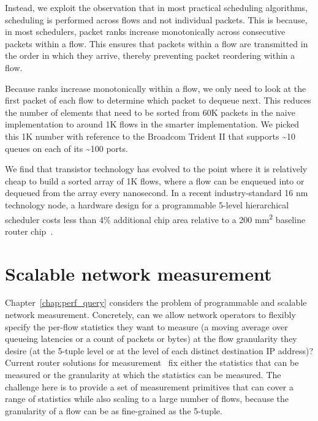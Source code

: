 Instead, we exploit the observation that in most practical scheduling
algorithms, scheduling is performed across flows and not individual packets.
This is because, in most schedulers, packet ranks increase monotonically across
consecutive packets within a flow. This ensures that packets within a flow are
transmitted in the order in which they arrive, thereby preventing packet
reordering within a flow.

Because ranks increase monotonically within a
flow, we only need to look at the first packet of each flow to determine which
packet to dequeue next. This reduces the number of elements that need to be
sorted from 60K packets in the naive implementation to around 1K flows in the
smarter implementation. We picked this 1K number with reference to the Broadcom
Trident II that supports \textasciitilde10 queues on each of its
\textasciitilde100 ports.

We find that transistor technology has evolved to the point where it is
relatively cheap to build a sorted array of 1K flows, where a flow can be
enqueued into or dequeued from the array every nanosecond. In a recent
industry-standard 16 nm technology node, a hardware design for a programmable
5-level hierarchical scheduler costs less than 4\% additional chip area
relative to a 200 \si{\milli\meter\squared} baseline router
chip~\cite{glen_parsing}.

\section{Scalable network measurement}
Chapter~\ref{chap:perf_query} considers the problem of programmable and
scalable network measurement. Concretely, can we allow network operators to
flexibly specify the per-flow statistics they want to measure (\eg a moving
average over queueing latencies or a count of packets or bytes) at the flow
granularity they desire (\eg at the 5-tuple level or at the level of each
distinct destination IP address)? Current router solutions for
measurement~\cite{netflow, tetration-telemetry} fix either the statistics that
can be measured or the granularity at which the statistics can be measured. The
challenge here is to provide a set of measurement primitives that can cover a
range of statistics while also scaling to a large number of flows, because the
granularity of a flow can be as fine-grained as the 5-tuple.

